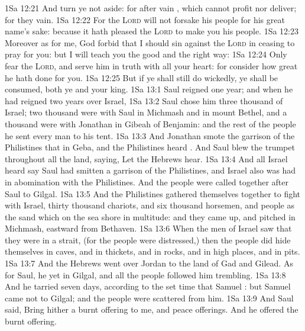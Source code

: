 \vs 1Sa 12:21 And turn ye not aside: for  after vain , which cannot profit nor deliver; for they  vain.
\vs 1Sa 12:22 For the \textsc{Lord} will not forsake his people for his great name's sake: because it hath pleased the \textsc{Lord} to make you his people.
\vs 1Sa 12:23 Moreover as for me, God forbid that I should sin against the \textsc{Lord} in ceasing to pray for you: but I will teach you the good and the right way:
\vs 1Sa 12:24 Only fear the \textsc{Lord}, and serve him in truth with all your heart: for consider how great  he hath done for you.
\vs 1Sa 12:25 But if ye shall still do wickedly, ye shall be consumed, both ye and your king.
\vs 1Sa 13:1 Saul reigned one year; and when he had reigned two years over Israel,
\vs 1Sa 13:2 Saul chose him three thousand  of Israel;  two thousand were with Saul in Michmash and in mount Bethel, and a thousand were with Jonathan in Gibeah of Benjamin: and the rest of the people he sent every man to his tent.
\vs 1Sa 13:3 And Jonathan smote the garrison of the Philistines that  in Geba, and the Philistines heard . And Saul blew the trumpet throughout all the land, saying, Let the Hebrews hear.
\vs 1Sa 13:4 And all Israel heard say  Saul had smitten a garrison of the Philistines, and  Israel also was had in abomination with the Philistines. And the people were called together after Saul to Gilgal.
\vs 1Sa 13:5 And the Philistines gathered themselves together to fight with Israel, thirty thousand chariots, and six thousand horsemen, and people as the sand which  on the sea shore in multitude: and they came up, and pitched in Michmash, eastward from Bethaven.
\vs 1Sa 13:6 When the men of Israel saw that they were in a strait, (for the people were distressed,) then the people did hide themselves in caves, and in thickets, and in rocks, and in high places, and in pits.
\vs 1Sa 13:7 And  the Hebrews went over Jordan to the land of Gad and Gilead. As for Saul, he  yet in Gilgal, and all the people followed him trembling.
\vs 1Sa 13:8 And he tarried seven days, according to the set time that Samuel : but Samuel came not to Gilgal; and the people were scattered from him.
\vs 1Sa 13:9 And Saul said, Bring hither a burnt offering to me, and peace offerings. And he offered the burnt offering.
